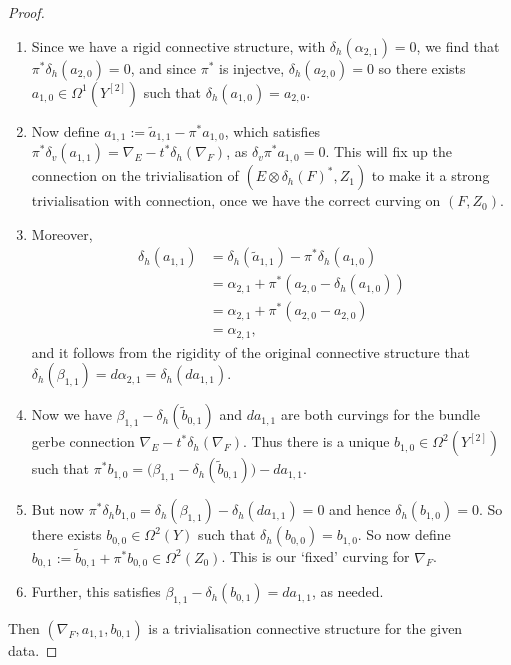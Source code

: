 \documentclass[12pt]{amsart}
\theoremstyle{plain}
\theoremstyle{definition}
\theoremstyle{remark}
\numberwithin{equation}{section}
\newcommand{\<}{\langle}
\renewcommand{\>}{\rangle}
\begin{document}
\begin{proof}
\begin{enumerate}
\item Since we have a rigid connective structure, with $\delta_h(\alpha_{2,1})=0$, we find that $\pi^*\delta_h(a_{2,0}) = 0$, and since $\pi^*$ is injectve, $\delta_h(a_{2,0})=0$ so there exists $a_{1,0} \in \Omega^1(Y^{[2]})$ such that $\delta_h(a_{1,0}) = a_{2,0}$.

\item Now define $a_{1,1} := \tilde a_{1,1} - \pi^* a_{1,0}$, which satisfies $\pi^*\delta_v(a_{1,1}) = \nabla_E - t^*\delta_h(\nabla_F)$, as $\delta_v\pi^*a_{1,0}=0$.
This will fix up the connection on the trivialisation of $(E\otimes \delta_h(F)^*,Z_1)$ to make it a strong trivialisation with connection, once we have the correct curving on $(F,Z_0)$.




\item Moreover, 
\begin{align}\label{eq:triv_connet_exist_prf_6}
\delta_h(a_{1,1}) & = \delta_h(\tilde a_{1,1}) - \pi^*\delta_h(a_{1,0})  \\
                  & = \alpha_{2,1} + \pi^*(a_{2,0} - \delta_h(a_{1,0}))  \nonumber\\
                  & = \alpha_{2,1} + \pi^*(a_{2,0} - a_{2,0} )  \nonumber\\
                  & = \alpha_{2,1},  \nonumber
\end{align}
and it follows from the rigidity of the original connective structure that $\delta_h(\beta_{1,1}) = d\alpha_{2,1} = \delta_h(da_{1,1})$.


\item Now we have $\beta_{1,1} - \delta_h(\tilde b_{0,1})$ and $da_{1,1}$ are both curvings for the bundle gerbe connection $\nabla_E - t^*\delta_h(\nabla_F)$. Thus there is a unique $b_{1,0} \in \Omega^2(Y^{[2]})$ such that $\pi^*b_{1,0} = \big(\beta_{1,1} - \delta_h(\tilde b_{0,1})\big) - da_{1,1}$.

\item But now $\pi^*\delta_h b_{1,0} = \delta_h(\beta_{1,1}) - \delta_h(da_{1,1}) = 0$ and hence $\delta_h(b_{1,0})=0$. So there exists $b_{0,0} \in \Omega^2(Y)$ such that $\delta_h(b_{0,0}) = b_{1,0}$. So now define $b_{0,1} := \tilde b_{0,1} + \pi^* b_{0,0} \in \Omega^2(Z_0)$. This is our `fixed' curving for $\nabla_F$.

\item Further, this satisfies $\beta_{1,1} - \delta_h(b_{0,1}) = da_{1,1}$, as needed.
\end{enumerate}

Then $(\nabla_F,a_{1,1},b_{0,1})$ is a trivialisation connective structure for the given data.
\end{proof}
\end{document}
